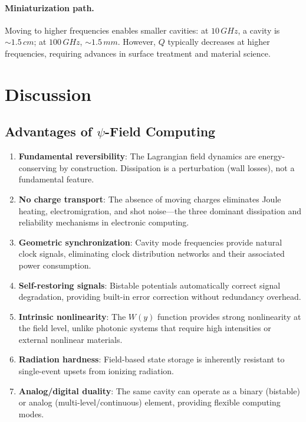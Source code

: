 \documentclass[12pt,a4paper,twoside]{article}
\begin{document}
\paragraph{Miniaturization path.} Moving to higher frequencies enables smaller cavities: at $10\,\si{GHz}$, a cavity is $\sim 1.5\,\si{cm}$; at $100\,\si{GHz}$, $\sim 1.5\,\si{mm}$. However, $Q$ typically decreases at higher frequencies, requiring advances in surface treatment and material science.

\section{Discussion}\label{sec:discussion}

\subsection{Advantages of $\psi$-Field Computing}\label{sec:advantages}

\begin{enumerate}
\item \textbf{Fundamental reversibility}: The Lagrangian field dynamics are energy-conserving by construction. Dissipation is a perturbation (wall losses), not a fundamental feature.

\item \textbf{No charge transport}: The absence of moving charges eliminates Joule heating, electromigration, and shot noise---the three dominant dissipation and reliability mechanisms in electronic computing.

\item \textbf{Geometric synchronization}: Cavity mode frequencies provide natural clock signals, eliminating clock distribution networks and their associated power consumption.

\item \textbf{Self-restoring signals}: Bistable potentials automatically correct signal degradation, providing built-in error correction without redundancy overhead.

\item \textbf{Intrinsic nonlinearity}: The $W(y)$ function provides strong nonlinearity at the field level, unlike photonic systems that require high intensities or external nonlinear materials.

\item \textbf{Radiation hardness}: Field-based state storage is inherently resistant to single-event upsets from ionizing radiation.

\item \textbf{Analog/digital duality}: The same cavity can operate as a binary (bistable) or analog (multi-level/continuous) element, providing flexible computing modes.
\end{enumerate}
\end{document}
